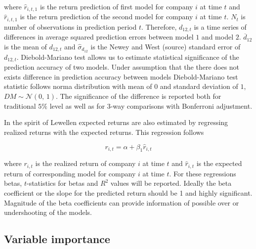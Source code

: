 \documentclass{article}
\begin{document}
where $\hat r_{i, t, 1}$ is the return prediction of first model for company $i$ at time $t$ and $\hat r_{i, t, 1}$ is the return prediction of the second model  for company $i$ at time $t$. $N_t$ is number of observations in prediction period $t$. Therefore, $d_{12, t}$ is a time series of differences in average squared prediction errors between model $1$ and model $2$. $\overline{d}_{12}$ is the mean of $d_{12, t}$ and $\hat \sigma_{d_{12}}$ is the Newey and West (source) standard error of $d_{12, t}$. Diebold-Mariano test allows us to estimate statistical significance of the prediction accuracy of two models. Under assumption that the there does not exists difference in prediction accuracy between models Diebold-Mariano test statistic follows norma distribution with mean of $0$ and standard deviation of $1$, $DM \sim \mathcal{N}(0,\, 1)$. The significance of the difference is reported both for traditional $5\%$ level as well as for 3-way comparisons with Bonferroni adjustment. \par

In the spirit of Lewellen \citeyear{Lewellen2015} expected returns are also estimated by regressing realized returns with the expected returns. This regression follows \par

\begin{equation}
\label{eq:realizedRegression}
r_{i, t} = \alpha + \beta_1 \hat r_{i, t}
\end{equation}

where $r_{i, t}$ is the realized return of company $i$ at time $t$ and $\hat r_{i, t}$ is the expected return of corresponding model for company $i$ at time $t$. For these regressions betas, $t$-statistics for betas and $R^2$ values will be reported. Ideally the beta coefficient or the slope for the predicted return should be 1 and highly significant. Magnitude of the beta coefficients can provide information of possible over or undershooting of the models. \par

\subsection{Variable importance} \label{VariableImportance}
\end{document}
